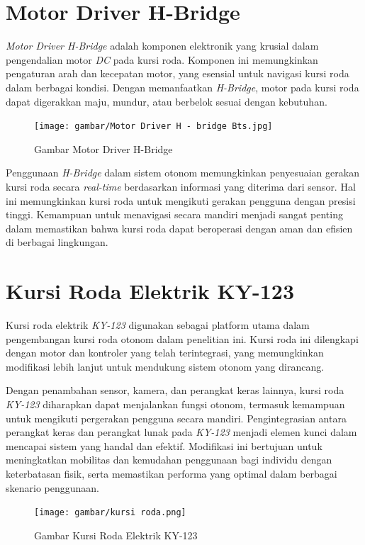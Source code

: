 \section{Motor Driver H-Bridge}
\label{sec:Motor}

\emph{Motor Driver H-Bridge} adalah komponen elektronik yang krusial dalam pengendalian motor \emph{DC} pada kursi roda. Komponen ini memungkinkan pengaturan arah dan kecepatan motor, yang esensial untuk navigasi kursi roda dalam berbagai kondisi. Dengan memanfaatkan \emph{H-Bridge}, motor pada kursi roda dapat digerakkan maju, mundur, atau berbelok sesuai dengan kebutuhan.

\begin{figure}[H]
  \centering
  \texttt{[image: gambar/Motor Driver H - bridge Bts.jpg]}
  \caption{Gambar Motor Driver H-Bridge}
  \label{fig:Gambar Motor Driver H-Bridge}
\end{figure}

Penggunaan \emph{H-Bridge} dalam sistem otonom memungkinkan penyesuaian gerakan kursi roda secara \emph{real-time} berdasarkan informasi yang diterima dari sensor. Hal ini memungkinkan kursi roda untuk mengikuti gerakan pengguna dengan presisi tinggi. Kemampuan untuk menavigasi secara mandiri menjadi sangat penting dalam memastikan bahwa kursi roda dapat beroperasi dengan aman dan efisien di berbagai lingkungan.

\section{Kursi Roda Elektrik KY-123}
\label{sec:KY-123}

Kursi roda elektrik \emph{KY-123} digunakan sebagai platform utama dalam pengembangan kursi roda otonom dalam penelitian ini. Kursi roda ini dilengkapi dengan motor dan kontroler yang telah terintegrasi, yang memungkinkan modifikasi lebih lanjut untuk mendukung sistem otonom yang dirancang.

Dengan penambahan sensor, kamera, dan perangkat keras lainnya, kursi roda \emph{KY-123} diharapkan dapat menjalankan fungsi otonom, termasuk kemampuan untuk mengikuti pergerakan pengguna secara mandiri. Pengintegrasian antara perangkat keras dan perangkat lunak pada \emph{KY-123} menjadi elemen kunci dalam mencapai sistem yang handal dan efektif. Modifikasi ini bertujuan untuk meningkatkan mobilitas dan kemudahan penggunaan bagi individu dengan keterbatasan fisik, serta memastikan performa yang optimal dalam berbagai skenario penggunaan.

\begin{figure}[H]
  \centering
  \texttt{[image: gambar/kursi roda.png]}
  \caption{Gambar Kursi Roda Elektrik KY-123}
  \label{fig:Gambar Kursi Roda Elektrik KY-123}
\end{figure}